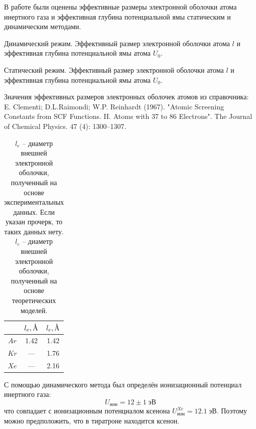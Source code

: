 \documentclass[10pt,a4paper]{article}
\newcommand{\angstrom}{\text{\normalfont\AA}}
\begin{document}
	В работе были оценены эффективные размеры электронной оболочки атома инертного газа и эффективная глубина потенциальной ямы статическим и динамическим методами.
	\begin{table}[H]
		\caption*{Динамический режим. Эффективный размер электронной оболочки атома $l$ и эффективная глубина потенциальной ямы атома $U_0$.}
		\begin{center}
			
		\end{center}
	\end{table}
	
	\begin{table}[H]
		\caption*{Статический режим. Эффективный размер электронной оболочки атома $l$ и эффективная глубина потенциальной ямы атома $U_0$.}
		\begin{center}
			
		\end{center}
	\end{table}
	
	\begin{table}[H]
		\caption*{Значения эффективных размеров электронных оболочек атомов из справочника: E. Clementi; D.L.Raimondi; W.P. Reinhardt (1967). "Atomic Screening Constants from SCF Functions. II. Atoms with 37 to 86 Electrons". The Journal of Chemical Physics. 47 (4): 1300–1307.}
		\begin{center}
			\begin{tabular}{ccc}
				\hline
				& $l_e, \angstrom$ & $l_c, \angstrom$ \\
				\hline
				$Ar$ & 1.42 & 1.42 \\
				$Kr$ & --- & 1.76 \\
				$Xe$ & --- & 2.16 \\
				\hline
			\end{tabular}
		\end{center}
		\caption*{$l_e$ -- диаметр внешней электронной оболочки, полученный на основе экспериментальных данных. Если указан прочерк, то таких данных нету. $l_c$ -- диаметр внешней электронной оболочки, полученный на основе теоретических моделей.}
	\end{table}
	
	С помощью динамического метода был определён ионизационный потенциал инертного газа:
	$$
	U_{ион} = 12 \pm 1 \; эВ
	$$
	что совпадает с ионизационным потенциалом ксенона $U_{ион}^{Xe} = 12.1 \; эВ$. Поэтому можно предположить, что в тиратроне находится ксенон.
	
\end{document}
